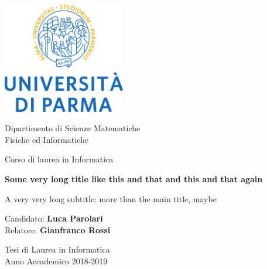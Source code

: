 \documentclass[12pt,a4paper,openright]{book} %
\begin{document}
\begin{titlepage}
    \begin{center}       
        \includegraphics[width=0.4\textwidth]{img/logo_unipr.png}

		\vspace{0.5cm}
		
		\Large
        Dipartimento di Scienze Matematiche\\
        Fisiche ed Informatiche

        \vspace{0.5cm}
        
        \Large
        Corso di laurea in Informatica 
		
		\vspace{1.5cm} 
 
        \Huge
        \textbf{Some very long title like this and that and this and that again}
 
        \vspace{1cm}
        \LARGE
        A very very long subtitle: more than the main title, maybe
 
        \vspace{1.5cm}
 
		\large Candidato: \Large\textbf{Luca Parolari}\\
		\large Relatore: \Large\textbf{Gianfranco Rossi}
	
		
        \vfill
 		
 		\large
        Tesi di Laurea in Informatica\\
        Anno Accademico 2018-2019
 
    \end{center}
\end{titlepage}
\end{document}
